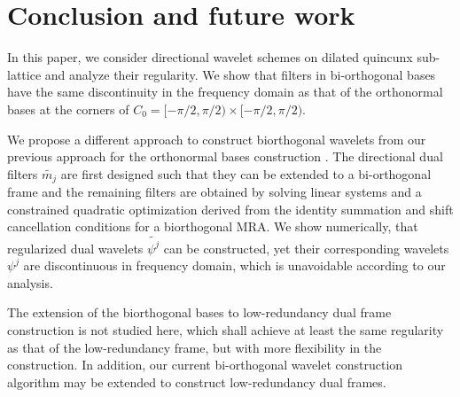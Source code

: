 \section{Conclusion and future work}\label{sec: end}
In this paper, we consider directional wavelet schemes on dilated quincunx sub-lattice and analyze their regularity. We show that filters in bi-orthogonal bases have the same discontinuity in the frequency domain as that of the orthonormal bases at the corners of $C_0 = [-\pi/2,\pi/2)\times[-\pi/2,\pi/2)$. 

 We propose a different approach to construct biorthogonal wavelets from our previous approach for the orthonormal bases construction \cite{yin2014orthshear}. The directional dual filters $\widetilde{m_j}$ are first designed such that they can be extended to a bi-orthogonal frame and the remaining filters are obtained by solving linear systems and a constrained quadratic optimization derived from the identity summation and shift cancellation conditions for a biorthogonal MRA. We show numerically, that regularized dual wavelets $\widetilde{\psi^j}$ can be constructed, yet their corresponding wavelets $\psi^j$ are discontinuous in frequency domain, which is unavoidable according to our analysis.

The extension of the biorthogonal bases to low-redundancy dual frame construction is not studied here, which shall achieve at least the same regularity as that of the low-redundancy frame, but with more flexibility in the construction. In addition, our current bi-orthogonal wavelet construction algorithm may be extended to construct low-redundancy dual frames.